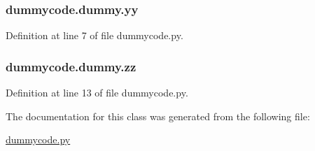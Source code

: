\subsubsection[{yy}]{\setlength{\rightskip}{0pt plus 5cm}dummycode.\-dummy.\-yy}\label{classdummycode_1_1dummy_ad0f056c4695b2525f883dbe1004fa7ba}


Definition at line 7 of file dummycode.\-py.

\subsubsection[{zz}]{\setlength{\rightskip}{0pt plus 5cm}dummycode.\-dummy.\-zz}\label{classdummycode_1_1dummy_af5c829ccdb5a89e8ba0f2cf476cb2aa0}


Definition at line 13 of file dummycode.\-py.



The documentation for this class was generated from the following file\-:\begin{DoxyCompactItemize}
\item 
\hyperlink{dummycode_8py}{dummycode.\-py}\end{DoxyCompactItemize}
